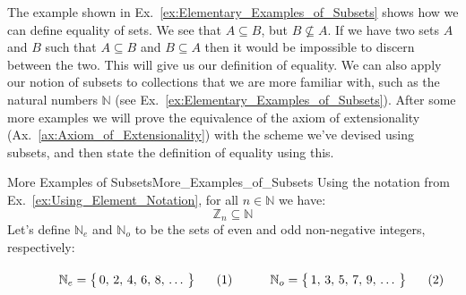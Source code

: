         The example shown in Ex.~\ref{ex:Elementary_Examples_of_Subsets} shows
        how we can define equality of sets. We see that $A\subseteq{B}$, but
        $B\nsubseteq{A}$. If we have two sets $A$ and $B$ such that
        $A\subseteq{B}$ and $B\subseteq{A}$ then it would be impossible to
        discern between the two. This will give us our definition of equality.
        We can also apply our notion of subsets to collections that we are more
        familiar with, such as the natural numbers $\mathbb{N}$
        (see Ex.~\ref{ex:Elementary_Examples_of_Subsets}). After some more
        examples we will prove the equivalence of the axiom of extensionality
        (Ax.~\ref{ax:Axiom_of_Extensionality}) with the scheme we've devised
        using subsets, and then state the definition of equality using this.
        \begin{fexample}{More Examples of Subsets}{More_Examples_of_Subsets}
            Using the notation from Ex.~\ref{ex:Using_Element_Notation}, for all
            $n\in\mathbb{N}$ we have:
            \begin{equation}
                \mathbb{Z}_{n}\subseteq\mathbb{N}
            \end{equation}
            Let's define $\mathbb{N}_{e}$ and $\mathbb{N}_{o}$ to be the sets of
            even and odd non-negative integers, respectively:
            \par
            \begin{subequations}
                \begin{minipage}[b]{0.49\textwidth}
                    \begin{equation}
                        \label{eqn:Even_Pos_Ints_Ellipses}%
                        \mathbb{N}_{e}=\big\{\,0,\,2,\,4,\,6,\,8,\,\dots\,\big\}
                    \end{equation}
                \end{minipage}
                \hfill
                \begin{minipage}[b]{0.49\textwidth}
                    \begin{equation}
                        \label{eqn:Odd_Pos_Ints_Ellipses}%
                        \mathbb{N}_{o}=\big\{\,1,\,3,\,5,\,7,\,9,\,\dots\,\big\}
                    \end{equation}
                \end{minipage}
            \end{subequations}
            \par\vspace{2.5ex}

\end{fexample}
